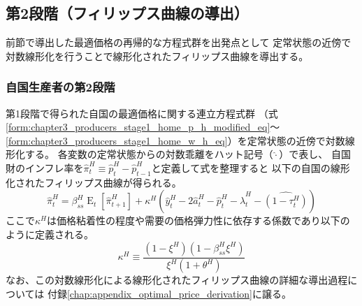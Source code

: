 
\subsection{第2段階（フィリップス曲線の導出）}
\label{sec:chapter3_producers_stage2}
前節で導出した最適価格の再帰的な方程式群を出発点として
定常状態の近傍で対数線形化を行うことで線形化されたフィリップス曲線を導出する。

\subsubsection{自国生産者の第2段階}
\label{sec:chapter3_producers_stage2_home}
第1段階で得られた自国の最適価格に関する連立方程式群
（式\ref{form:chapter3_producers_stage1_home_p_h_modified_eq}〜
\ref{form:chapter3_producers_stage1_home_w_h_eq}）を定常状態の近傍で対数線形化する。
各変数の定常状態からの対数乖離をハット記号（\(\hat{\cdot}\)）で表し、
自国財のインフレ率を\(\hat{\pi}_t^H\equiv\hat{p}_t^H-\hat{p}_{t-1}^H\)と定義して式を整理すると
以下の自国の線形化されたフィリップス曲線が得られる。
\begin{equation}
\label{form:chapter3_producers_stage2_home_nkpc_eq}
    \hat{\pi}_t^H=\beta_{ss}^H\operatorname{E}_t[\hat{\pi}_{t+1}^H]+\kappa^H\left(\hat{y}_t^H-2\hat{a}_t^H-\hat{p}_t^H-\hat{\lambda}_t^H-\widehat{(1-\tau_t^H)}\right)
\end{equation}
ここで\(\kappa^H\)は価格粘着性の程度や需要の価格弾力性に依存する係数であり以下のように定義される。
\begin{equation}
\label{form:chapter3_producers_stage2_home_kappa_eq}
    \kappa^H\equiv\frac{(1-\xi^H)(1-\beta_{ss}^H\xi^H)}{\xi^H(1+\theta^H)}
\end{equation}
なお、この対数線形化による線形化されたフィリップス曲線の詳細な導出過程については
付録\ref{chap:appendix_optimal_price_derivation}に譲る。

